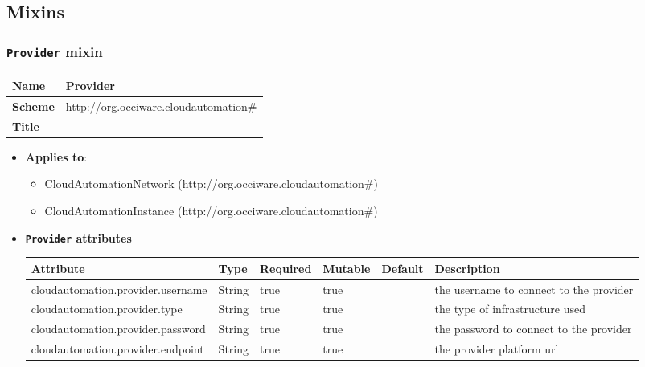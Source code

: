 \subsection{Mixins}
\subsubsection{\texttt{Provider} mixin}
\begin{center}
\begin{tabular}{|l|l|}
  \hline
  \textbf{Name} & Provider \\
  \hline  
  \textbf{Scheme} & http://org.occiware.cloudautomation\# \\
  \hline
  \textbf{Title} &  \\
  \hline
\end{tabular}
\end{center}
\begin{itemize}
\item \textbf{Applies to}:
\begin{itemize}
	\item CloudAutomationNetwork (http://org.occiware.cloudautomation\#)
	\item CloudAutomationInstance (http://org.occiware.cloudautomation\#)
\end{itemize}
\end{itemize} 

\begin{itemize}
\item \textbf{\texttt{Provider} attributes}

\begin{tabularx}{\textwidth}{|l|l|p{1.4cm}|p{1.3cm}|l|X|}
  \hline
  \textbf{Attribute} & \textbf{Type} & \textbf{Required} & \textbf{Mutable} & \textbf{Default} & \textbf{Description} \\
  \hline  
  cloudautomation.provider.username & String & true & true &  & the username to connect to the provider
 \\
  \hline
  cloudautomation.provider.type & String & true & true &  & the type of infrastructure used \\
  \hline
  cloudautomation.provider.password & String & true & true &  & the password to connect to the provider \\
  \hline
  cloudautomation.provider.endpoint & String & true & true &  & the provider platform url \\
  \hline
\end{tabularx}
\end{itemize}


